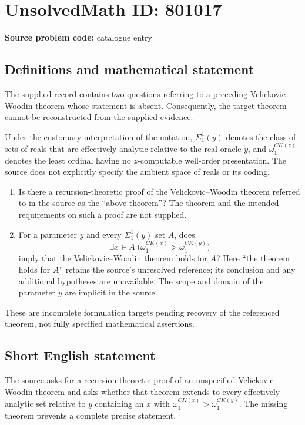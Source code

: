 \documentclass[11pt]{article}
\begin{document}
\section*{UnsolvedMath ID: 801017}
\textbf{Source problem code:} catalogue entry
\subsection{Definitions and mathematical statement}
The supplied record contains two questions referring to a preceding Velickovic--Woodin theorem whose statement is absent. Consequently, the target theorem cannot be reconstructed from the supplied evidence.

Under the customary interpretation of the notation, \(\Sigma^1_1(y)\) denotes the class of sets of reals that are effectively analytic relative to the real oracle \(y\), and \(\omega_1^{CK(z)}\) denotes the least ordinal having no \(z\)-computable well-order presentation. The source does not explicitly specify the ambient space of reals or its coding.

\begin{enumerate}
\item Is there a recursion-theoretic proof of the Velickovic--Woodin theorem referred to in the source as the ``above theorem''? The theorem and the intended requirements on such a proof are not supplied.
\item For a parameter \(y\) and every \(\Sigma^1_1(y)\) set \(A\), does
\[
\exists x\in A\;\bigl(\omega_1^{CK(x)}>\omega_1^{CK(y)}\bigr)
\]
imply that the Velickovic--Woodin theorem holds for \(A\)? Here ``the theorem holds for \(A\)'' retains the source's unresolved reference; its conclusion and any additional hypotheses are unavailable. The scope and domain of the parameter \(y\) are implicit in the source.
\end{enumerate}
These are incomplete formulation targets pending recovery of the referenced theorem, not fully specified mathematical assertions.
\subsection{Short English statement}
The source asks for a recursion-theoretic proof of an unspecified Velickovic--Woodin theorem and asks whether that theorem extends to every effectively analytic set relative to \(y\) containing an \(x\) with \(\omega_1^{CK(x)}>\omega_1^{CK(y)}\). The missing theorem prevents a complete precise statement.
\end{document}
